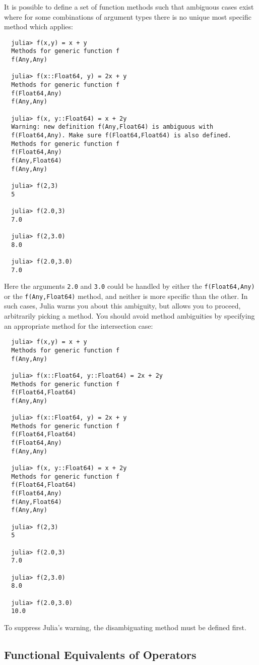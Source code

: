 \documentclass{article}
\begin{document}
It is possible to define a set of function methods such that ambiguous cases exist where for some combinations of argument types there is no unique most specific method which applies:
\begin{verbatim}
  julia> f(x,y) = x + y
  Methods for generic function f
  f(Any,Any)

  julia> f(x::Float64, y) = 2x + y
  Methods for generic function f
  f(Float64,Any)
  f(Any,Any)

  julia> f(x, y::Float64) = x + 2y
  Warning: new definition f(Any,Float64) is ambiguous with
  f(Float64,Any). Make sure f(Float64,Float64) is also defined.
  Methods for generic function f
  f(Float64,Any)
  f(Any,Float64)
  f(Any,Any)

  julia> f(2,3)
  5

  julia> f(2.0,3)
  7.0

  julia> f(2,3.0)
  8.0

  julia> f(2.0,3.0)
  7.0
\end{verbatim}
Here the arguments \verb|2.0| and \verb|3.0| could be handled by either the \verb|f(Float64,Any)| or the \verb|f(Any,Float64)| method, and neither is more specific than the other.
In such cases, Julia warns you about this ambiguity, but allows you to proceed, arbitrarily picking a method.
You should avoid method ambiguities by specifying an appropriate method for the intersection case:
\begin{verbatim}
  julia> f(x,y) = x + y
  Methods for generic function f
  f(Any,Any)

  julia> f(x::Float64, y::Float64) = 2x + 2y
  Methods for generic function f
  f(Float64,Float64)
  f(Any,Any)

  julia> f(x::Float64, y) = 2x + y
  Methods for generic function f
  f(Float64,Float64)
  f(Float64,Any)
  f(Any,Any)

  julia> f(x, y::Float64) = x + 2y
  Methods for generic function f
  f(Float64,Float64)
  f(Float64,Any)
  f(Any,Float64)
  f(Any,Any)

  julia> f(2,3)
  5

  julia> f(2.0,3)
  7.0

  julia> f(2,3.0)
  8.0

  julia> f(2.0,3.0)
  10.0
\end{verbatim}
To suppress Julia's warning, the disambiguating method must be defined first.

\subsection{Functional Equivalents of Operators}
\end{document}
